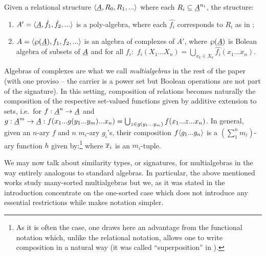 \documentclass[10pt]{article}
\begin{document}
\begin{Definition}
\label{de:cmplx}
Given a relational structure $\langle\underline {A},R_0,R_1,...\rangle$ where each
$R_i\subseteq \underline {A}^{n_{i}}$, the structure:
%
\begin{enumerate}\MyLPar
\item 
$A'=\langle\underline {A},\hat{f_1},\hat{f_2},...\rangle$ is a poly-algebra,
where each $\hat{f_i}$ corresponds to $R_i$ as in ;
\item 
$A=\langle\wp(\underline {A}),f_1,f_2,...\rangle$ is an algebra of complexes of
$A'$, where $\wp(\underline {A})$ is Bolean algebra of subsets of $\underline {A}$ and for all $f_i:$ $f_i(X_1...X_n)=\bigcup_{x_{k}\in X_{k}}
\hat{f_i}(x_1...x_n)$.
\end{enumerate}
\end{Definition}
%
Algebras of complexes are what we call {\em multialgebras\/} in the
rest of the paper (with one proviso -- the carrier is a power set but Boolean
operations are not part of the signature). 
In this setting, composition of relations becomes
naturally the composition of the respective set-valued functions given
by additive extension to sets, i.e.\ for $f:\underline {A}^n\rightarrow\underline {A}$
and $g:\underline {A}^m\rightarrow\underline {A}: f(x_1...g(y_1...y_m)...x_n) =
\bigcup_{z\in g(y_{1}...y_{m})} f(x_1...z...x_n)$.  In general, given
an $n$-ary $f$ and $n$ $m_i$-ary $g_i$'s, their composition
$f\langle g_1...g_n\rangle$ is a $(\sum_1^n m_i)$-ary function $h$ given 
by:\footnote{As it is often the case, one draws here an advantage from
the functional notation which, unlike the relational notation, allows
one to write composition in a natural way (it was called
``superposition'' in \cite{JT1}).}
%
where $\overline {x}_i$ is an $m_i$-tuple.
 
We may now talk about similarity types, or signatures, for
multialgebras in the way entirely analogous to standard algebras. In
particular, the above mentioned works study many-sorted multialgebras
but we, as it was stated in the introduction concentrate on the
one-sorted case which does not introduce any essential restrictions
while makes notation simpler.

\end{document}
